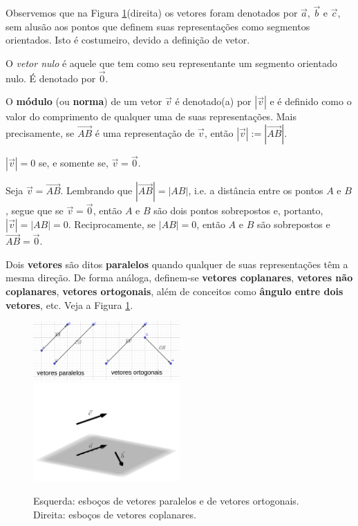 Observemos que na Figura \ref{fig:vetorrel}(direita) os vetores foram denotados por $\vec{a}$, $\vec{b}$ e $\vec{c}$, sem alusão aos pontos que definem suas representações como segmentos orientados. Isto é costumeiro, devido a definição de vetor.

O \emph{vetor nulo} é aquele que tem como seu representante um segmento orientado nulo. É denotado por $\vec{0}$.

O {\bf módulo} (ou {\bf norma}) de um vetor $\vec{v}$ é denotado(a) por $|\vec{v}|$ e é definido como o valor do comprimento de qualquer uma de suas representações. Mais precisamente, se $\overrightarrow{AB}$ é uma representação de $\vec{v}$, então $|\vec{v}| := |\overrightarrow{AB}|$.

\begin{obs}
  $|\vec{v}| = 0$ se, e somente se, $\vec{v} = \vec{0}$.

  Seja $\vec{v} = \overrightarrow{AB}$. Lembrando que $|\overrightarrow{AB}| = |AB|$, i.e. a distância entre os pontos $A$ e $B$, segue que se $\vec{v} = \vec{0}$, então $A$ e $B$ são dois pontos sobrepostos e, portanto, $|\vec{v}| = |AB| = 0$. Reciprocamente, se $|AB| = 0$, então $A$ e $B$ são sobrepostos e $\overrightarrow{AB} = \vec{0}$.
\end{obs}

Dois {\bf vetores} são ditos {\bf paralelos}  quando qualquer de suas representações têm a mesma direção. De forma análoga, definem-se {\bf vetores coplanares}, {\bf vetores não coplanares}, {\bf vetores ortogonais}, além de conceitos como {\bf ângulo entre dois vetores}, etc. Veja a Figura \ref{fig:vetorrel}.

\begin{figure}[h!]
  \centering
  \includegraphics[width=0.5\textwidth]{./cap_vetor/dados/fig_vetorrel/fig_vetorrel}~
  \includegraphics[width=0.5\textwidth]{./cap_vetor/dados/fig_vcolineares/fig_vcolineares}
  \caption{Esquerda: esboços de vetores paralelos e de vetores ortogonais. Direita: esboços de vetores coplanares.}
  \label{fig:vetorrel}
\end{figure}

